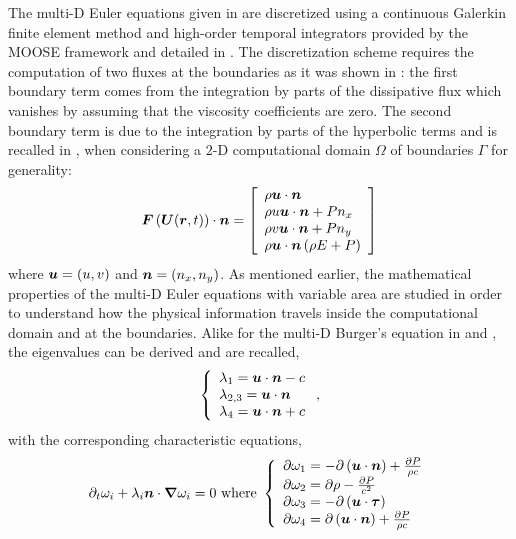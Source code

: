 The multi-D Euler equations given in  are discretized using a continuous Galerkin finite element method and high-order temporal integrators provided by the MOOSE framework and detailed in . The discretization scheme requires the computation of two fluxes at the boundaries as it was shown in : the first boundary term comes from the integration by parts of the dissipative flux which vanishes by assuming that the viscosity coefficients are zero. The second boundary term is due to the integration by parts of the hyperbolic terms and is recalled in , when considering a $2$-D computational domain $\Omega$ of boundaries $\Gamma$ for generality:
%
\begin{equation}\label{eq:hyp_flux_bc_sct3}
\boldsymbol F \left( \boldsymbol U(\boldsymbol r, t) \right) \cdot \boldsymbol n = 
\left[ 
\begin{array}{l}
\rho \boldsymbol u \cdot \boldsymbol n\\
\rho u \boldsymbol u \cdot \boldsymbol n + P n_x \\
\rho v \boldsymbol u \cdot \boldsymbol n + P n_y \\
\rho \boldsymbol u \cdot \boldsymbol n \left( \rho E + P \right) 
\end{array}
\right]
\end{equation}
%
where $\boldsymbol u = \left( u , v \right)$ and $\boldsymbol n = \left( n_x, n _y \right)$. As mentioned earlier, the mathematical properties of the multi-D Euler equations with variable area are studied in order to understand how the physical information travels inside the computational domain and at the boundaries. Alike for the multi-D Burger's equation in  and , the eigenvalues can be derived \cite{Toro} and are recalled,
%
\begin{equation}\label{eq:eig_euler_2d_sct3}
\left\{
\begin{array}{l}
\lambda_1 = \boldsymbol u \cdot \boldsymbol n - c \\
\lambda_{2,3} = \boldsymbol u \cdot \boldsymbol n \\
\lambda_4 = \boldsymbol u \cdot \boldsymbol n + c \\
\end{array}
\right. ,
\end{equation}
%
with the corresponding characteristic equations,
%
\begin{equation}\label{eq:charac_euler_sct3}
\partial_t \omega_i + \lambda_i \boldsymbol n \cdot  \boldsymbol{\nabla} \omega_i = 0 \text{ where } 
\left\{
\begin{array}{l}
\partial \omega_1 = -\partial \left( \boldsymbol u \cdot \boldsymbol n \right) + \frac{\partial P}{\rho c}\\
\partial \omega_2 = \partial \rho - \frac{\partial P}{c^2} \\
\partial \omega_3 = -\partial \left( \boldsymbol u \cdot \boldsymbol\tau \right)\\
\partial \omega_4 = \partial \left( \boldsymbol u \cdot \boldsymbol n \right) + \frac{\partial P}{\rho c}\\
\end{array}
\right. 
\end{equation}
